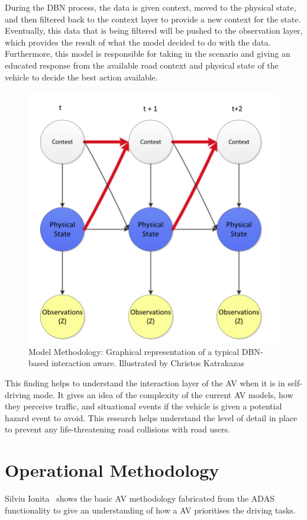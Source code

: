 \documentclass[12pt]{report} %
\begin{document}
		During the DBN process, the data is given context, moved to the physical state, and then filtered back to the context layer to provide a new context for the state. Eventually, this data that is being filtered will be pushed to the observation layer, which provides the result of what the model decided to do with the data. Furthermore, this model is responsible for taking in the scenario and giving an educated response from the available road context and physical state of the vehicle to decide the best action available.
		\begin{figure}[ht]
			\centering
			\includegraphics[width=.60\columnwidth]{Figures/literature_review/Research/DBN_Model.png}
			\caption{Model Methodology: Graphical representation of a typical DBN-based interaction aware. Illustrated by Christos Katrakazas~\cite{katrakazas_new_2019}}
			\label{fig:avmModelMethodology}
		\end{figure}

		This finding helps to understand the interaction layer of the AV when it is in self-driving mode. It gives an idea of the complexity of the current AV models, how they perceive traffic, and situational events if the vehicle is given a potential hazard event to avoid. This research helps understand the level of detail in place to prevent any life-threatening road collisions with road users.

	\section{Operational Methodology}
		Silviu Ionita~\cite{ionita_autonomous_2017} shows the basic AV methodology fabricated from the ADAS functionality to give an understanding of how a AV prioritises the driving tasks. 
		
\end{document}
